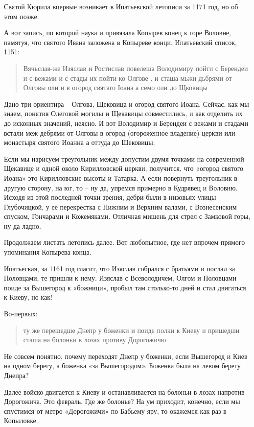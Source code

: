 \documentclass[a5paper,11pt,openany]{article}
\begin{document}
Святой Кюрила впервые возникает в Ипатьевской летописи за 1171 год, но об этом позже.

А вот запись, по которой наука и привязала Копырев конец к горе Воловне, памятуя, что святого Ивана заложена в Копыреве конци. Ипатьевский список, 1151:

\begin{quotation}
\noindent Вячьслав-же Изяслав и Ростислав повелеша Володимиру пойти с Берендеи и с вежами и с стады их пойти ко Олгове . и сташа мьжи дьбрями от Олговы оли и в огород святаго Іоана а семо оли до Щковицы
\end{quotation}

Дано три ориентира – Олгова, Щековица и огород святого Иоана. Сейчас, как мы знаем, понятия Олеговой могилы и Щекавицы совместились, и как отделить их до исконных значений, неясно. И вот Володимир и Берендеи с вежами и стадами встали меж дебрями от Олговы в огород (огороженное владение) церкви или монастыря святого Иоанна а оттуда до Щековицы.

Если мы нарисуем треугольник между допустим двумя точками на современной Щекавице и одной около Кирилловской церкви, получится, что «огород святого Иоана» это Кирилловские высоты и Татарка. А если повернуть треугольник в другую сторону, на юг, то – ну да, упремся примерно в Кудрявец и Воловню. Исходя из этой последней точки зрения, дебри были в низовьях улицы Глубочицкой, у ее перекрестка с Нижним и Верхним валами, с Вознесенским спуском, Гончарами и Кожемяками. Отличная мишень для стрел с Замковой горы, ну да ладно.

Продолжаем листать летопись далее. Вот любопытное, где нет впрочем прямого упоминания Копырева конца.

Ипатьеская, за 1161 год гласит, что Изяслав собрался с братьями и послал за Половцами, те пришли к нему. Изяслав с Всеволодичем, Олгом и Половцами поиде за Вышегород к «божници», пробыл там столько-то дней и стал двигаться к Киеву, но как!

Во-первых:

\begin{quotation}
\noindent ту же перешедше Днепр у боженки и поиде полки к Киеву и пришедши сташа на болоньи  в лозах противу Дорогожичю
\end{quotation}
  
Не совсем понятно, почему переходят Днепр у боженки, если Вышегород и Киев на одном берегу, а боженка «за Вышегородом». Боженка была на левом берегу Днепра? 

Далее войско двигается к Киеву и останавливается на болоньи в лозах напротив Дорогожича. Это февраль. Где же болонье? На ум приходит, конечно, если мы спустимся от метро «Дорогожичи» по Бабьему яру, то окажемся как раз в Копыловке. 
\end{document}
